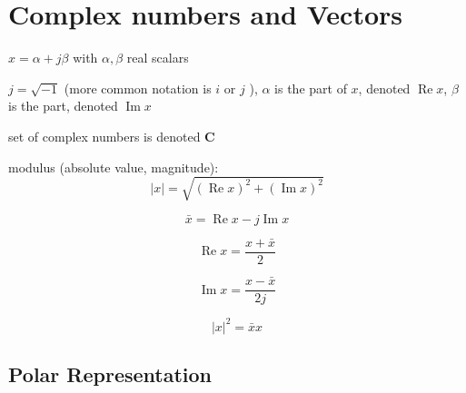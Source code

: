 \section{Complex numbers and Vectors}

\begin{definition}
    $ x=\alpha+{j} \beta $ with $ \alpha, \beta $ real scalars

    $ {j}=\sqrt{-1} $ (more common notation is $ i $ or $ j $ ), $ \alpha $ is the  part of $ x $, denoted $ \operatorname{Re} x $, $ \beta $ is the  part, denoted $ \operatorname{Im} x $
\end{definition}

\begin{definition}
    set of complex numbers is denoted $ \mathbf{C} $
\end{definition}

\begin{definition}[Modulus]
    modulus (absolute value, magnitude): \begin{equation} |x|=\sqrt{(\operatorname{Re} x)^{2}+(\operatorname{Im} x)^{2}} \end{equation}
\end{definition}

\begin{definition}[Conjugate]
    \begin{equation} \bar{x}=\operatorname{Re} x-{j} \operatorname{Im} x \end{equation}
\end{definition}

\begin{theorem}
    \begin{equation} \operatorname{Re} x=\frac{x+\bar{x}}{2} \end{equation}
\end{theorem}

\begin{theorem}
    \begin{equation} \operatorname{Im} x=\frac{x-\bar{x}}{2 {j}} \end{equation}
\end{theorem}

\begin{theorem}
    \begin{equation} |x|^{2}=\bar{x} x \end{equation}
\end{theorem}

\subsection{Polar Representation}

